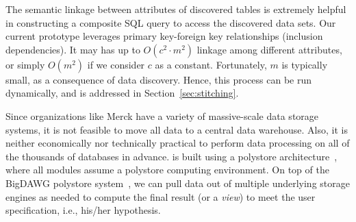 The semantic linkage between attributes of discovered tables is extremely helpful in constructing a composite \textsf{SQL} query to access the discovered data sets. 
%
Our current prototype leverages primary key-foreign key relationships (inclusion dependencies).
It may has up to $O(c^2 \cdot m^2)$ linkage among different attributes, or simply $O(m^2)$ if we consider $c$ as a constant.
%
Fortunately, $m$ is typically small, as a consequence of data discovery.
Hence, this process can be run dynamically, and is addressed in Section~\ref{sec:stitching}.



Since organizations like Merck have a variety of massive-scale data storage systems, it is not feasible to move all data to a central data warehouse. Also, it is neither economically nor technically practical to perform data processing on all of the thousands of databases in advance. 
\dcv is built using a polystore architecture~\cite{DBLP:journals/sigmod/DugganESBHKMMMZ15}, where all modules assume a polystore computing environment.
On top of the BigDAWG polystore system~\cite{DBLP:journals/pvldb/ElmoreDSBCGHHKK15}, we can pull data out of multiple underlying storage engines as needed to compute the final result (or a {\em view}) to meet the user specification, i.e., his/her hypothesis. 



